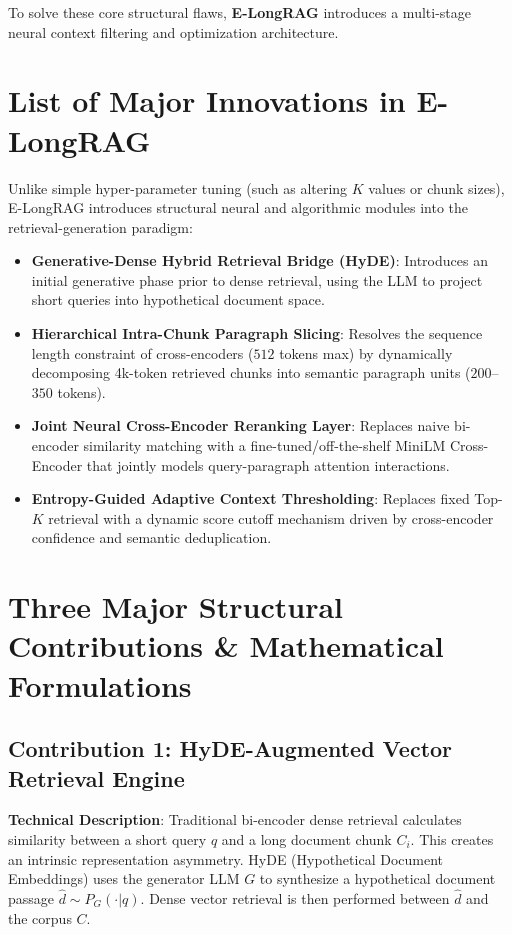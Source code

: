\documentclass[11pt,a4paper]{article}
\begin{document}
To solve these core structural flaws, \textbf{E-LongRAG} introduces a multi-stage neural context filtering and optimization architecture.

\section{List of Major Innovations in E-LongRAG}
Unlike simple hyper-parameter tuning (such as altering $K$ values or chunk sizes), E-LongRAG introduces structural neural and algorithmic modules into the retrieval-generation paradigm:

\begin{itemize}
    \item \textbf{Generative-Dense Hybrid Retrieval Bridge (HyDE)}: Introduces an initial generative phase prior to dense retrieval, using the LLM to project short queries into hypothetical document space.
    \item \textbf{Hierarchical Intra-Chunk Paragraph Slicing}: Resolves the sequence length constraint of cross-encoders ($512$ tokens max) by dynamically decomposing 4k-token retrieved chunks into semantic paragraph units ($200$--$350$ tokens).
    \item \textbf{Joint Neural Cross-Encoder Reranking Layer}: Replaces naive bi-encoder similarity matching with a fine-tuned/off-the-shelf MiniLM Cross-Encoder that jointly models query-paragraph attention interactions.
    \item \textbf{Entropy-Guided Adaptive Context Thresholding}: Replaces fixed Top-$K$ retrieval with a dynamic score cutoff mechanism driven by cross-encoder confidence and semantic deduplication.
\end{itemize}

\section{Three Major Structural Contributions \& Mathematical Formulations}

\subsection{Contribution 1: HyDE-Augmented Vector Retrieval Engine}
\textbf{Technical Description}: Traditional bi-encoder dense retrieval calculates similarity between a short query $q$ and a long document chunk $C_i$. This creates an intrinsic representation asymmetry. HyDE (Hypothetical Document Embeddings) uses the generator LLM $G$ to synthesize a hypothetical document passage $\hat{d} \sim P_G(\cdot | q)$. Dense vector retrieval is then performed between $\hat{d}$ and the corpus $C$.
\end{document}
